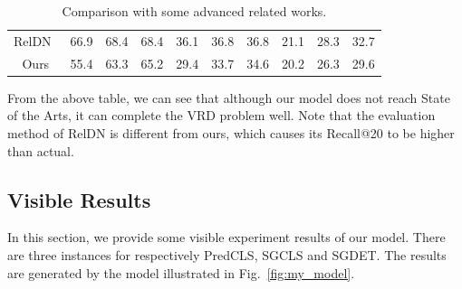 \begin{table}[!h]
{\begin{tabular}{c|ccc|ccc|ccc}
		RelDN~\cite{zhang2019graphical}                   & 66.9                 & 68.4                 & 68.4                  & 36.1                 & 36.8                 & 36.8                  & 21.1                 & 28.3                 & 32.7                  \\
		Ours                   & 55.4       & 63.3       & 65.2        & 29.4      & 33.7      &34.6              & 20.2                    & 26.3                    & 29.6                     \\ \hline
	\end{tabular}}

\caption[Comparison with some advanced related works.]{Comparison with some advanced related works.}
\label{tab:compare_recall}
\end{table}

From the above table, we can see that although our model does not reach State of the Arts, it can complete the VRD problem well. Note that the evaluation method of RelDN is different from ours, which causes its Recall@20 to be higher than actual.

\subsection{Visible Results}
In this section, we provide some visible experiment results of our model. There are three instances for respectively PredCLS, SGCLS and SGDET. The results are generated by the model illustrated in Fig.~\ref{fig:my_model}.


